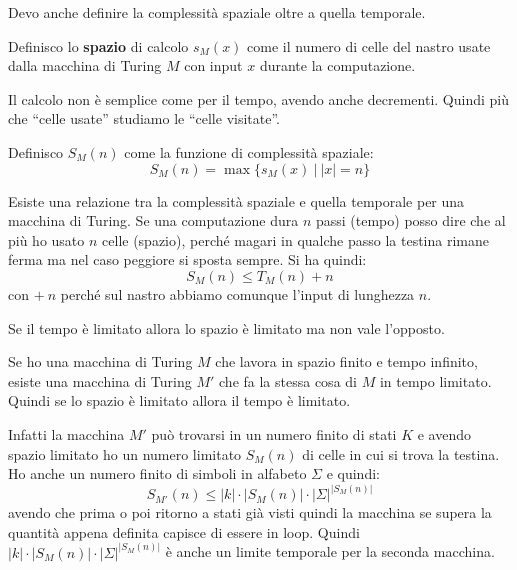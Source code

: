 Devo anche definire la complessità spaziale oltre a quella temporale.
\begin{definizione}
     Definisco lo \textbf{spazio} di calcolo $s_M(x)$ come il numero di celle del 
     nastro usate dalla macchina di Turing $M$ con input $x$ durante la computazione.
     
     Il calcolo non è semplice come per il tempo, avendo anche decrementi. Quindi 
     più che “celle usate” studiamo le “celle visitate”.
\end{definizione}
\begin{definizione}
    Definisco $S_M(n)$ come la funzione di complessità spaziale:
    \begin{equation}
        S_M(n) =  \max\{s_M(x)\ |\  |x| = n\}
    \end{equation}
\end{definizione}

Esiste una relazione tra la complessità spaziale e quella temporale per una macchina 
di Turing. Se una computazione dura $n$ passi (tempo) posso dire che al più ho usato 
$n$ celle (spazio), perché magari in qualche passo la testina rimane ferma ma nel 
caso peggiore si sposta sempre. Si ha quindi:
\begin{equation}
    S_M(n) \leq T_M(n) + n
\end{equation}
con $+ \ n$ perché sul nastro abbiamo comunque l'input di lunghezza $n$.

\begin{teorema}
    Se il tempo è limitato allora lo spazio è limitato ma non vale l'opposto.     
\end{teorema}
\begin{teorema}
    Se ho una macchina di Turing $M$ che lavora in spazio finito e tempo infinito, 
    esiste una macchina di Turing $M'$ che fa la stessa cosa di $M$ in tempo 
    limitato. Quindi se lo spazio è limitato allora il tempo è limitato.
\end{teorema}
\begin{dimostrazione}
    Infatti la macchina $M'$ può trovarsi in un numero finito di stati $K$ e 
    avendo spazio limitato ho un numero limitato $S_M(n)$ di celle in cui si trova 
    la testina. Ho anche un numero finito di simboli in alfabeto $\Sigma$ e quindi:
    \begin{equation}
        S_{M'}(n) \leq |k| \cdot |S_M(n)| \cdot |\Sigma|^{|S_M(n)|}
    \end{equation}
    avendo che prima o poi ritorno a stati già visti quindi la macchina se supera 
    la quantità appena definita capisce di essere in loop. Quindi 
    $|k| \cdot |S_M(n)| \cdot |\Sigma|^{|S_M(n)|}$ è anche un limite temporale 
    per la seconda macchina.
\end{dimostrazione}

